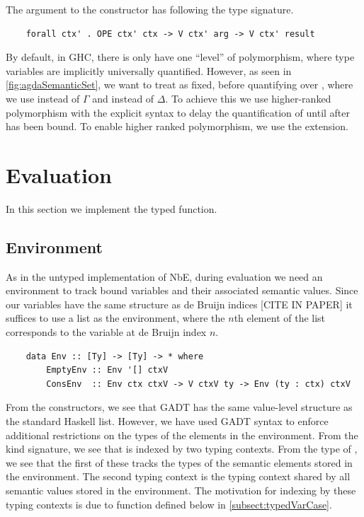 
The argument to the  constructor has following the type signature.
\begin{lstlisting}
    forall ctx' . OPE ctx' ctx -> V ctx' arg -> V ctx' result 
\end{lstlisting}

By default, in GHC, there is only have one “level” of polymorphism, where type variables are implicitly universally quantified. However, as seen in \ref{fig:agdaSemanticSet}, we want to treat  as fixed, before quantifying over , where we use  instead of $\Gamma$ and  instead of $\Delta$.
To achieve this we use higher-ranked polymorphism with the explicit  syntax to delay the quantification of  until after  has been bound. To enable higher ranked polymorphism, we use the  extension. 


\section{Evaluation}

In this section we implement the typed  function.

\subsection{Environment}


As in the untyped implementation of NbE, during evaluation we need an environment to track bound variables and their associated semantic values. Since our variables have the same structure as de Bruijn indices [CITE IN PAPER] it suffices to use a list as the environment, where the $n$th element of the list corresponds to the variable at de Bruijn index $n$.


\begin{lstlisting}
    data Env :: [Ty] -> [Ty] -> * where
        EmptyEnv :: Env '[] ctxV
        ConsEnv  :: Env ctx ctxV -> V ctxV ty -> Env (ty : ctx) ctxV
\end{lstlisting}

From the constructors, we see that  GADT has the same value-level structure as the standard Haskell list. However, we have used GADT syntax to enforce additional restrictions on the types of the elements in the environment. From the kind signature, we see that  is indexed by two typing contexts. From the type of , we see that the first of these tracks the types of the semantic elements stored in the environment. The second typing context is the typing context shared by all semantic values stored in the environment. The motivation for indexing  by these typing contexts is due to  function defined below in \ref{subsect:typedVarCase}.



